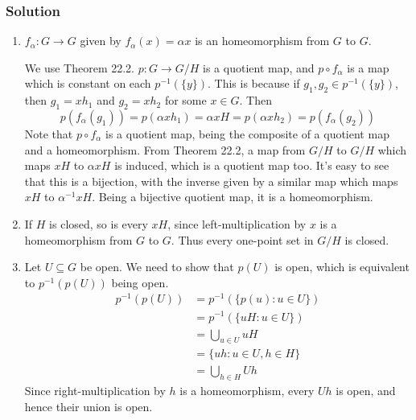 \subsubsection{Solution}
\begin{enumerate}
\item $f_\alpha : G \to G$ given by $f_\alpha(x) = \alpha x$ is an homeomorphism from $G$ to $G$.

\begin{center}
\end{center}
We use Theorem 22.2. $p : G \to G/H$ is a quotient map, and $p \circ f_\alpha$ is a map which is constant on each $p^{-1}(\{y\})$. This is because if $g_1,g_2 \in p^{-1}(\{y\})$, then $g_1 = xh_1$ and $g_2 = xh_2$ for some $x \in G$. Then 
\[p(f_\alpha(g_1)) = p(\alpha x h_1) = \alpha x H = p(\alpha x h_2) = p(f_\alpha(g_2))\]
Note that $p \circ f_\alpha$ is a quotient map, being the composite of a quotient map and a homeomorphism. From Theorem 22.2, a map from $G/H$ to $G/H$ which maps $xH$ to $\alpha xH$ is induced, which is a quotient map too. It's easy to see that this is a bijection, with the inverse given by a similar map which maps $xH$ to $\alpha^{-1} xH$. Being a bijective quotient map, it is a homeomorphism.

\item If $H$ is closed, so is every $xH$, since left-multiplication by $x$ is a homeomorphism from $G$ to $G$. Thus every one-point set in $G/H$ is closed.

\item Let $U \subseteq G$ be open. We need to show that $p(U)$ is open, which is equivalent to $p^{-1}(p(U))$ being open.
\begin{align*}
p^{-1}(p(U)) &= p^{-1}(\{p(u) : u \in U \}) \\
&= p^{-1}(\{uH : u \in U \}) \\
&= \bigcup_{u \in U} uH \\
&= \{uh : u \in U, h \in H \} \\
&= \bigcup_{h \in H} Uh
\end{align*}
Since right-multiplication by $h$ is a homeomorphism, every $Uh$ is open, and hence their union is open.


\end{enumerate}

